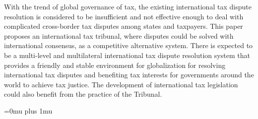 With the trend of global governance of tax, the existing international tax dispute resolution is considered to be insufficient and not effective enough to deal with complicated cross-border tax disputes among states and taxpayers.
This paper proposes an international tax tribunal, where disputes could be solved with international consensus, as a competitive alternative system.
There is expected to be a multi-level and multilateral international tax dispute resolution system that provides a friendly and stable environment for globalization for resolving international tax disputes and benefiting tax interests for governments around the world to achieve tax justice. The development of international tax legislation could also benefit from the practice of the Tribunal.


\pagebreak


\Urlmuskip=0mu plus 1mu\relax
\setcounter{biburllcpenalty}{7000}
\setcounter{biburlucpenalty}{8000}
\printbibliography


